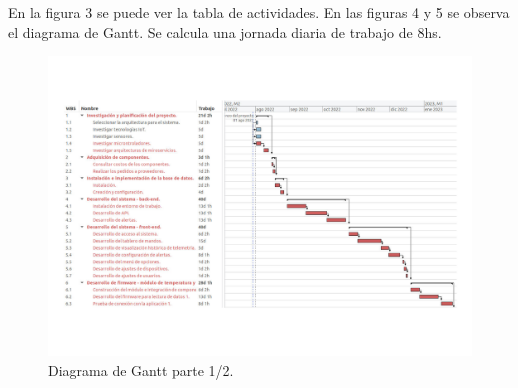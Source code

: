 \documentclass[
11pt, %
]{charter}
\begin{document}
En la figura 3 se puede ver la tabla de actividades. En las figuras 4 y 5 se observa el diagrama de Gantt. Se calcula una jornada diaria de trabajo de 8hs.


\begin{landscape}
\begin{figure}[htpb]
\centering 
\includegraphics[height=.85\textheight]{./Figuras/DiagramaGantt_1.png}
\caption{Diagrama de Gantt parte 1/2.}
\label{fig:diagGantt}
\end{figure}
\end{landscape}
\end{document}

